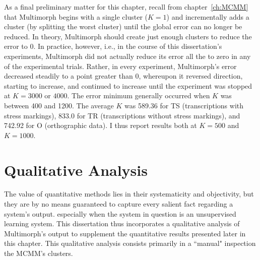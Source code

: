 As a final preliminary matter for this chapter, recall from chapter~\ref{ch:MCMM}  that Multimorph begins with a single cluster ($K = 1$) 
and incrementally adds a cluster (by splitting the worst cluster) until the global error can no longer be reduced. 
In theory, Multimorph should create just enough clusters to reduce the error
to 0. In practice, however, i.e., in the course of this dissertation's experiments,
 Multimorph did not actually reduce its error all the to zero in any of the experimental trials. 
 Rather, in every experiment, Multimorph's error decreased steadily to a point greater than 0, 
 whereupon it reversed direction, starting to 
increase, and continued to increase until the experiment was stopped at $K = 3000$ or $4000$.  
The error minimum generally occurred when $K$ was between 400 and 1200. 
The average $K$ was 589.36 for TS (transcriptions with stress markings), 833.0 for 
TR (transcriptions without stress markings), and 742.92 for O (orthographic data). I thus 
report results both at $K = 500$ and $K = 1000$.

\section{Qualitative Analysis}
\label{sec:qual}
The value of quantitative methods lies in their systematicity and objectivity, but
	they are by no means guaranteed to capture every salient fact regarding a system's output. 
	especially when the system in question is an unsupervised learning system. 
	 This dissertation thus incorporates a qualitative analysis of Multimorph's output to supplement the  
	 quantitative results presented later in this chapter.
	This qualitative analysis consists primarily in a ``manual" inspection the MCMM's clusters.
	
